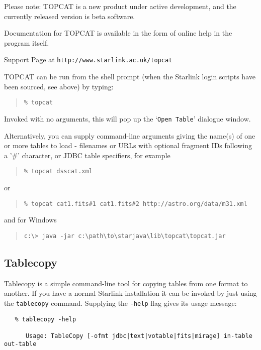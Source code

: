 \documentclass[twoside,11pt]{article}
\newcommand{\htmladdnormallink}[2]{#1}
\newcommand{\latex}[1]{#1}
\newcommand{\xlabel}[1]{}
\renewcommand{\_}{\texttt{\symbol{95}}}
\begin{document}
Please note: TOPCAT is a new product under active development, and the 
             currently released version is beta software. 

Documentation for TOPCAT is available in the form of online help 
in the program itself.

Support Page at 
\htmladdnormallink{\texttt{http://www.starlink.ac.uk/topcat}}{http://www.starlink.ac.uk/topcat}

TOPCAT can be run from the shell prompt (when the Starlink login scripts have 
been sourced, see above) by typing:

\begin{quote}
\begin{verbatim}
% topcat
\end{verbatim}
\end{quote}

Invoked with no arguments, this will pop up the `\texttt{Open Table}' dialogue window.

Alternatively, you can supply command-line arguments giving the name(s) of one 
or more tables to load - filenames or URLs with optional fragment IDs following
a '\#' character, or JDBC table specifiers, for example

\begin{quote}
\begin{verbatim}
% topcat dsscat.xml
\end{verbatim}
\end{quote}

or

\begin{quote}
\begin{verbatim}
% topcat cat1.fits#1 cat1.fits#2 http://astro.org/data/m31.xml
\end{verbatim}
\end{quote}


and for Windows

\begin{quote}
\begin{verbatim}
c:\> java -jar c:\path\to\starjava\lib\topcat\topcat.jar
\end{verbatim}
\end{quote}


\subsection{\label{tablecopy}\xlabel{tablecopy}Tablecopy}

Tablecopy is a simple command-line tool for copying tables from
one format to another. If you have a normal Starlink installation it
can be invoked by just using the \texttt{tablecopy} command.
Supplying the \texttt{-help} flag gives its usage message:
\begin{verbatim}
   % tablecopy -help

      Usage: TableCopy [-ofmt jdbc|text|votable|fits|mirage] in-table out-table 

\end{verbatim}
\end{document}
